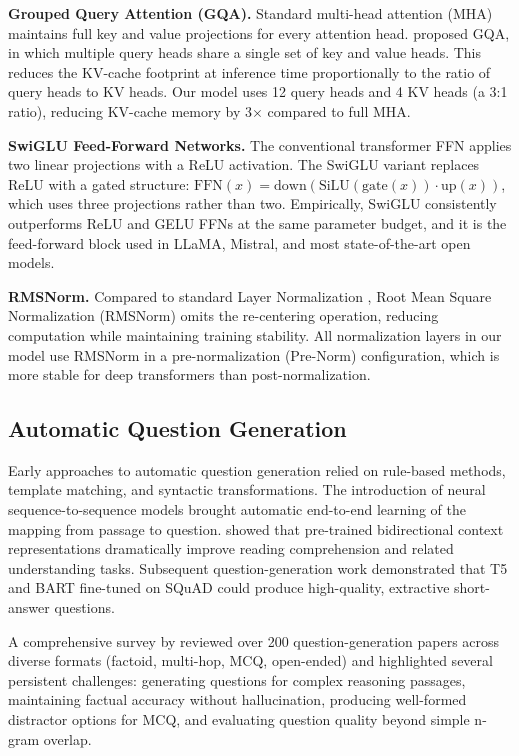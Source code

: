 \documentclass[12pt]{article}
\begin{document}
\textbf{Grouped Query Attention (GQA).} Standard multi-head attention (MHA) maintains full key and value projections for every attention head. \citet{ainslie2023gqa} proposed GQA, in which multiple query heads share a single set of key and value heads. This reduces the KV-cache footprint at inference time proportionally to the ratio of query heads to KV heads. Our model uses 12 query heads and 4 KV heads (a 3:1 ratio), reducing KV-cache memory by 3$\times$ compared to full MHA.

\textbf{SwiGLU Feed-Forward Networks.} The conventional transformer FFN applies two linear projections with a ReLU activation. The SwiGLU variant \citep{shazeer2020glu} replaces ReLU with a gated structure: $\text{FFN}(x) = \text{down}(\text{SiLU}(\text{gate}(x)) \cdot \text{up}(x))$, which uses three projections rather than two. Empirically, SwiGLU consistently outperforms ReLU and GELU FFNs at the same parameter budget, and it is the feed-forward block used in LLaMA, Mistral, and most state-of-the-art open models.

\textbf{RMSNorm.} Compared to standard Layer Normalization \citep{ba2016layer}, Root Mean Square Normalization (RMSNorm) \citep{zhang2019root} omits the re-centering operation, reducing computation while maintaining training stability. All normalization layers in our model use RMSNorm in a pre-normalization (Pre-Norm) configuration, which is more stable for deep transformers than post-normalization.

\subsection{Automatic Question Generation}

Early approaches to automatic question generation relied on rule-based methods, template matching, and syntactic transformations. The introduction of neural sequence-to-sequence models brought automatic end-to-end learning of the mapping from passage to question. \citet{devlin2019bert} showed that pre-trained bidirectional context representations dramatically improve reading comprehension and related understanding tasks. Subsequent question-generation work demonstrated that T5 \citep{raffel2020t5} and BART \citep{lewis2020bart} fine-tuned on SQuAD \citep{rajpurkar2016squad} could produce high-quality, extractive short-answer questions.

A comprehensive survey by \citet{zheng2023survey} reviewed over 200 question-generation papers across diverse formats (factoid, multi-hop, MCQ, open-ended) and highlighted several persistent challenges: generating questions for complex reasoning passages, maintaining factual accuracy without hallucination, producing well-formed distractor options for MCQ, and evaluating question quality beyond simple n-gram overlap.
\end{document}
